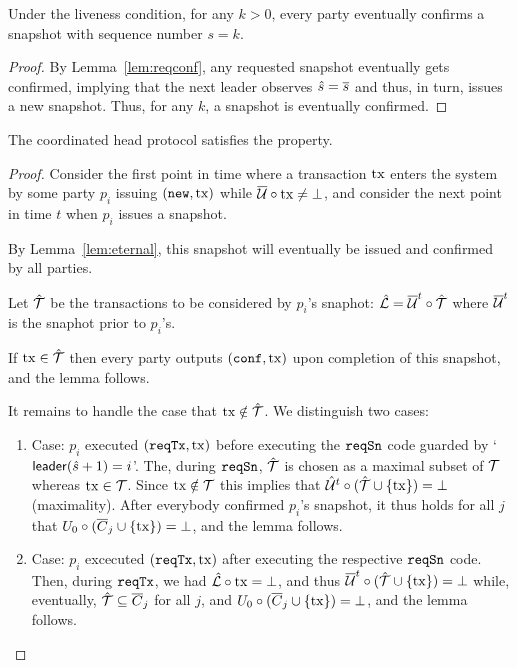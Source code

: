 \begin{lemma}\label{lem:eternal}
  Under the liveness condition, for any $k>0$, every party eventually confirms
  a snapshot with sequence number $s=k$.
\end{lemma}
\begin{proof}
  By Lemma~\ref{lem:reqconf}, any requested snapshot eventually gets confirmed, implying
  that the next leader observes $\hat s=\overline s$ and thus, in turn, issues a new snapshot.
  Thus, for any $k$, a snapshot is eventually confirmed.
\end{proof}

\begin{lemma}[Liveness]
  \label{lem:liveness}
  The coordinated head protocol satisfies the  property.
\end{lemma}
\begin{proof}
  Consider the first point in time where a transaction $\mathrm{tx}$ enters the system by some party $p_i$
  issuing $(\mathtt{new},\mathrm{tx})$ while $\overline {\mathcal U}\circ\mathrm{tx}\not=\bot$, and consider the next point in time
  $t$ when $p_i$ issues a snapshot.

  By Lemma~\ref{lem:eternal}, this snapshot will eventually be issued and confirmed by all parties.
  
  \medskip
  
  Let $\hat {\mathcal T}$ be the transactions to be considered by $p_i$'s snaphot: $\hat {\mathcal L}=\overline {\mathcal U}^{t}\circ\hat {\mathcal T}$
  where $\overline {\mathcal U}^{t}$ is the snaphot prior to $p_i$'s.

  \medskip
  
  If $\mathrm{tx}\in\hat {\mathcal T}$ then every party outputs $(\mathtt{conf},\mathrm{tx})$ upon completion of this snapshot, and
  the lemma follows.

  \medskip
  
  It remains to handle the case that $\mathrm{tx}\notin\hat {\mathcal T}$. We distinguish two cases:
  \begin{enumerate}
  \item %
     Case: $p_i$ executed $(\mathtt{reqTx},\mathrm{tx})$ before executing the $\mathtt{reqSn}$ code guarded
     by `$\mathsf{leader}(\hat s+1)=i$'.
     The, during $\mathtt{reqSn}$, $\hat {\mathcal T}$ is chosen as a maximal subset of ${\mathcal T}$ whereas $\mathrm{tx}\in{\mathcal T}$.
     Since $\mathrm{tx}\notin{\mathcal T}$ this implies that $\hat {\mathcal U}^{t}\circ(\hat {\mathcal T}\cup\{\mathrm{tx}\})=\bot$ (maximality).
     After everybody confirmed $p_i$'s snapshot, it thus holds for all $j$ that
     $U_0\circ(\overline{C}_j\cup\{\mathrm{tx}\})=\bot$, and the lemma follows.
   \item %
     Case: $p_i$ excecuted $(\mathtt{reqTx},\mathrm{tx})$ after executing the respective $\mathtt{reqSn}$ code.
     Then, during $\mathtt{reqTx}$, we had $\hat {\mathcal L}\circ\mathrm{tx}=\bot$, and thus
     $\overline {\mathcal U}^{t}\circ(\hat {\mathcal T}\cup\{\mathrm{tx}\})=\bot$ while, eventually,
     $\hat {\mathcal T}\subseteq\overline{C}_j$ for all $j$, and
     $U_0\circ(\overline{C}_j\cup\{\mathrm{tx}\})=\bot$, and the lemma follows.\qedhere  
  \end{enumerate}
\end{proof}

